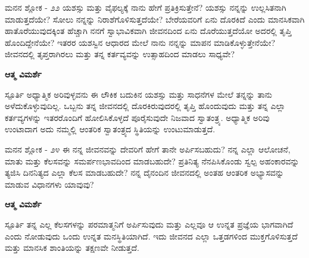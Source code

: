 \begin{mananam}{\mananamfont \large ಮನನ ಶ್ಲೋಕ - ೨೨}
\mananamtext ಯಶಸ್ಸು ಮತ್ತು ವೈಫಲ್ಯಕ್ಕೆ ನಾನು ಹೇಗೆ ಪ್ರತಿಕ್ರಿಸುತ್ತೇನೆ? ಯಶಸ್ಸು ನನ್ನನ್ನು ಉಲ್ಲಸಿತನಾಗಿ ಮಾಡುತ್ತದೆಯೇ? ಸೋಲು ನನ್ನನ್ನು ನಿರಾಶೆಗೊಳಿಸುತ್ತದೆಯೇ? ಬೇರೆಯವರಿಗೆ ಏನು ದೊರಕಿದೆ ಎಂದು ಮಾನಸಿಕವಾಗಿ ಹಾತೊರೆಯುವುದಕ್ಕಿಂತ ಹೆಚ್ಚಾಗಿ ನನಗೆ ಸ್ವಾಭಾವಿಕವಾಗಿ ಜೀವನದಿಂದ ಏನು ದೊರೆಯುತ್ತದೆಯೋ ಅದರಲ್ಲಿ ತೃಪ್ತಿ ಹೊಂದಿದ್ದೇನೆಯೇ? ಇತರರ ಯಶಸ್ವಿನ ಆಧಾರದ ಮೇಲೆ ನಾನು ನನ್ನನ್ನು ಮಾಪನ ಮಾಡಿಕೊಳ್ಳುತ್ತೇನೆಯೇ? ಜೀವನದಲ್ಲಿ ತೃಪ್ತರಾಗಿರಲು ಮತ್ತು ತನ್ನ ಕರ್ತವ್ಯವನ್ನು ಉತ್ಸಾಹದಿಂದ ಮಾಡಲು ಸಾಧ್ಯವೇ?
\end{mananam}
\WritingHand\enspace\textbf{ಆತ್ಮ ವಿಮರ್ಶೆ}\\
\begin{inspiration}{\mananamfont \large ಸ್ಪೂರ್ತಿ}
\mananamtext ಅಧ್ಯಾತ್ಮಿಕ ಅರಿವುಳ್ಳವನು ಈ ಲೌಕಿಕ ಬದುಕಿನ ಯಶಸ್ಸು ಮತ್ತು ಸಾಧನೆಗಳ ಮೇಲೆ ತನ್ನನ್ನು ತಾನು ಅಳೆದುಕೊಳ್ಳುವುದಿಲ್ಲ. ಒಬ್ಬನು ತನ್ನ ಜೀವನದಲ್ಲಿ ದೊರಕಿರುವುದರಲ್ಲಿ ತೃಪ್ತಿ ಹೊಂದುವುದು ಮತ್ತು ತನ್ನ ಎಲ್ಲಾ ಕರ್ತವ್ಯಗಳನ್ನು ಇತರರೊಂದಿಗೆ ಹೋಲಿಸಿಕೊಳ್ಳದೆ ಪೂರೈಸುವುದೇ ನಿಜವಾದ ಸ್ವಾತಂತ್ರ್ಯ.  ಅಧ್ಯಾತ್ಮಿಕ  ಅರಿವು ಉಂಟಾದಾಗ ಅದು ನಮ್ಮಲ್ಲಿ ಆಂತರಿಕ ಸ್ವಾತಂತ್ರ್ಯದ ಸ್ಥಿತಿಯನ್ನು ಉಂಟುಮಾಡುತ್ತದೆ. 
\end{inspiration}
\newpage

\begin{mananam}{\mananamfont \large ಮನನ ಶ್ಲೋಕ - ೨೪}
\mananamtext ಈ ನನ್ನ ಜೀವನವನ್ನು ದೇವರಿಗೆ ಹೇಗೆ ತಾನೇ ಅರ್ಪಿಸಬಹುದು? ನನ್ನ ಎಲ್ಲಾ ಆಲೋಚನೆ, ಮಾತು ಮತ್ತು ಕೆಲಸವನ್ನು ಸಮರ್ಪಣಭಾವದಿಂದ ಮಾಡಬಹುದೇ? ಪ್ರತಿನಿತ್ಯ ನೆನಪಿಸಿಕೊಂಡು ಸ್ವಲ್ಪ ಅಹಂಕಾರವನ್ನು ತ್ಯಜಿಸಿ ದಿನನಿತ್ಯದ ಎಲ್ಲಾ ಕೆಲಸ ಮಾಡಬಹುದೇ? ನನ್ನ ದೈನಂದಿನ ಜೀವನದಲ್ಲಿ ಅಂತಹ ಆಂತರಿಕ ಅಭ್ಯಾಸವನ್ನು ಮಾಡುವ ವಿಧಾನಗಳು ಯಾವುವು?
\end{mananam}
\WritingHand\enspace\textbf{ಆತ್ಮ ವಿಮರ್ಶೆ}\\
\begin{inspiration}{\mananamfont \large ಸ್ಪೂರ್ತಿ}
\mananamtext ತನ್ನ ಎಲ್ಲ ಕೆಲಸಗಳನ್ನು ಪರಮಾತ್ಮನಿಗೆ ಅರ್ಪಿಸುವುದು ಮತ್ತು ಎಲ್ಲವೂ ಆ ಉನ್ನತ ಪ್ರಜ್ಞೆಯ ಭಾಗವಾಗಿದೆ ಎಂದು ನೋಡುವುದು ಒಂದು ಉನ್ನತ ಮನಸ್ಥಿತಿಯಾಗಿದೆ. ಇದು ಜೀವನದ ಎಲ್ಲಾ ಒತ್ತಡಗಳಿಂದ ಮುಕ್ತಗೊಳಿಸುತ್ತದೆ ಮತ್ತು ಮಾನಸಿಕ ಶಾಂತಿಯನ್ನು ತಕ್ಷಣವೇ ನೀಡುತ್ತದೆ.
\end{inspiration}
\newpage

